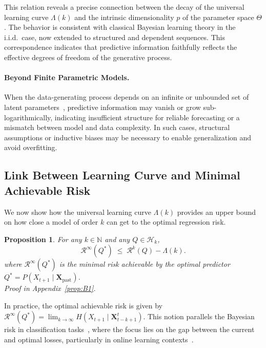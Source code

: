 \documentclass{article}
\newtheorem{proposition}[theorem]{Proposition}
\begin{document}
This relation reveals a precise connection between the decay of the universal learning curve $\Lambda(k)$ and the intrinsic dimensionality $p$ of the parameter space $\Theta$. The behavior is consistent with classical Bayesian learning theory in the i.i.d.\ case, now extended to structured and dependent sequences. This correspondence indicates that predictive information faithfully reflects the effective degrees of freedom of the generative process.

\paragraph{Beyond Finite Parametric Models.}

When the data-generating process depends on an infinite or unbounded set of latent parameters~\cite{bialek1999predictive, barron1991minimum}, predictive information may vanish or grow sub-logarithmically, indicating insufficient structure for reliable forecasting or a mismatch between model and data complexity. In such cases, structural assumptions or inductive biases may be necessary to enable generalization and avoid overfitting.

\subsection{Link Between Learning Curve and Minimal Achievable Risk}

We now show how the universal learning curve $\Lambda(k)$ provides an upper bound on how close a model of order $k$ can get to the optimal regression risk.
\begin{proposition}
For any $k \in \mathbb{N}$ and any $Q \in \mathcal{H}_k$,
\begin{equation*}
   \mathcal R^{\infty}(Q^{*})
   \;\le\;
   \mathcal R^{k}(Q) - \Lambda(k).
\end{equation*}
where $\mathcal{R}^{\infty}(Q^*)$ is the minimal risk achievable by the optimal predictor $Q^* = P(X_{t+1} \mid \mathbf{X}_{\text{past}})$.\\
\textit{Proof in Appendix~\ref{prop:B1}.}
\end{proposition}

In practice, the optimal achievable risk is given by $\mathcal{R}^{\infty}(Q^{*}) = \lim_{k \to \infty} H(X_{t+1} \mid \mathbf{X}_{t-k+1}^{t})$. This notion parallels the Bayesian risk in classification tasks~\cite{snapp1995estimating}, where the focus lies on the gap between the current and optimal losses, particularly in online learning contexts~\cite{hartline2015no, hsu2019empirical, lu2022no}.
\end{document}
